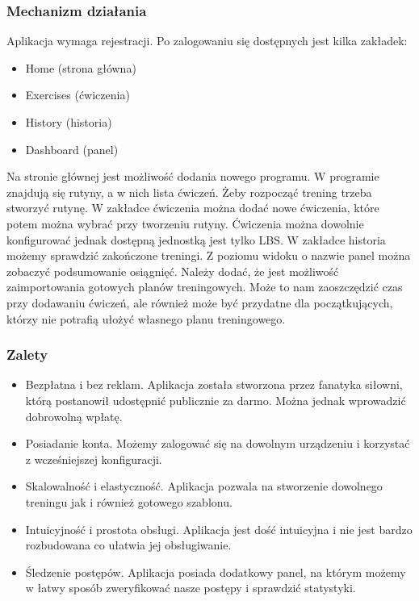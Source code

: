 \documentclass{article}
\begin{document}
            \subsubsection*{Mechanizm działania}
                  Aplikacja wymaga rejestracji. Po zalogowaniu się dostępnych jest kilka zakładek:
                  \begin{itemize}
                        \item Home (strona główna)
                        \item Exercises (ćwiczenia)
                        \item History (historia)
                        \item Dashboard (panel)
                  \end{itemize}
                  Na stronie głównej jest możliwość dodania nowego programu. W programie znajdują się rutyny, a w nich lista ćwiczeń. Żeby rozpocząć trening trzeba stworzyć rutynę. W zakładce ćwiczenia można dodać nowe ćwiczenia, które potem można wybrać przy tworzeniu rutyny. Ćwiczenia można dowolnie konfigurować jednak dostępną jednostką jest tylko LBS. W zakładce historia możemy sprawdzić zakończone treningi. Z poziomu widoku o nazwie panel można zobaczyć podsumowanie osiągnięć. Należy dodać, że jest możliwość zaimportowania gotowych planów treningowych. Może to nam zaoszczędzić czas przy dodawaniu ćwiczeń, ale również może być przydatne dla początkujących, którzy nie potrafią ułożyć własnego planu treningowego.
            \subsubsection*{Zalety}
                  \begin{itemize}
                        \item Bezpłatna i bez reklam. Aplikacja została stworzona przez fanatyka siłowni, którą postanowił udostępnić publicznie za darmo. Można jednak wprowadzić dobrowolną wpłatę.
                        \item Posiadanie konta. Możemy zalogować się na dowolnym urządzeniu i korzystać z wcześniejszej konfiguracji.
                        \item Skalowalność i elastyczność. Aplikacja pozwala na stworzenie dowolnego treningu jak i również gotowego szablonu.
                        \item Intuicyjność i prostota obsługi. Aplikacja jest dość intuicyjna i nie jest bardzo rozbudowana co ułatwia jej obsługiwanie.
                        \item Śledzenie postępów. Aplikacja posiada dodatkowy panel, na którym możemy w łatwy sposób zweryfikować nasze postępy i sprawdzić statystyki.
                  \end{itemize}
\end{document}
